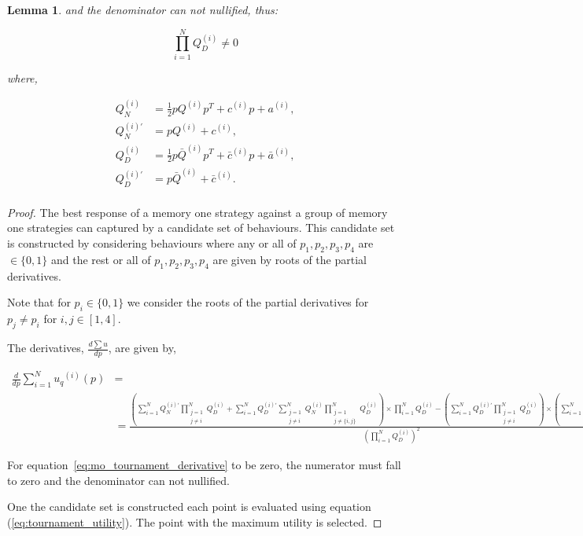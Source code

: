 \documentclass[10pt]{article}
\newtheorem{lemma}[theorem]{Lemma}
\begin{document}
\begin{lemma}
    and the denominator can not nullified, thus:

    \begin{equation}\label{eq:group_derivative_denominator_condition}
        \prod\limits_{i=1} ^ N Q_{D}^{(i)} \neq 0
    \end{equation}

    where,

    \begin{align*}
        Q_{N}^{(i) } & = \frac{1}{2} pQ^{(i)} p^T + c^{(i)} p + a^ {(i)}, \\
        Q_{N}^{(i)'} & =  pQ^{(i)} + c^{(i)}, \\
        Q_{D}^{(i) } & = \frac{1}{2} p\bar{Q}^{(i)} p^T + \bar{c}^{(i)} p + \bar{a}^ {(i)}, \\
        Q_{D}^{(i)'} & =  p\bar{Q}^{(i)} + \bar{c}^{(i)}. \\
    \end{align*}
\end{lemma}

\begin{proof} The best response of a memory one strategy against a group of memory
    one strategies can captured by a candidate set of behaviours. This candidate
    set is constructed by considering behaviours where any or all of \(p_1, p_2, p_3, p_4\)
    are \(\in \{0, 1\}\) and the rest or all of \(p_1, p_2, p_3, p_4\) are given by
    roots of the partial derivatives.

    Note that for \(p_i \in \{0, 1\}\) we consider the roots of the partial derivatives
    for \(p_j \neq p_i\) for \(i,j \in [1, 4]\).

    The derivatives, \(\frac{d\sum u}{dp}\), are given by,

    {\scriptsize
    \begin{align}\label{eq:mo_tournament_derivative}
        \frac{d}{dp} \sum\limits_{i=1} ^ {N} {u_q}^{(i)} (p) & = \nonumber \\
        & =\frac{
        (\sum\limits_{i=1} ^ {N} Q_{N}^{(i)'} \prod_{\substack{j=1 \\ j \neq i}} ^ N Q_{D}^{(i)}
        + \sum\limits_{i=1} ^ {N} Q_{D}^{(i)'} \sum_{\substack{j=1 \\ j \neq i}} ^ {N} Q_{N}^{(i)}
       \prod_{\substack{j=1 \\ j \neq \{i, j\}}} ^ N Q_{D}^{(i)}) \times
       \prod\limits_{i=1} ^ N Q_{D}^{(i)} - (\sum\limits_{i=1} ^ {N} Q_{D}^{(i)'}
       \prod_{\substack{j=1 \\ j \neq i}} ^ N Q_{D}^{(i)}) \times
       (\sum\limits_{i=1} ^ {N} Q_{N}^{(i)} \prod_{\substack{j=1 \\ j \neq i}} ^ N Q_{D}^{(i)})}
        {(\prod\limits_{i=1} ^ N Q_{D}^{(i)})^{2}}
    \end{align}
    }

    For equation~\ref{eq:mo_tournament_derivative} to be zero, the numerator must fall
    to zero and the denominator can not nullified.

    One the candidate set is constructed each point is evaluated using equation
    (\ref{eq:tournament_utility}). The point with the maximum utility is selected.
\end{proof}
\end{document}

